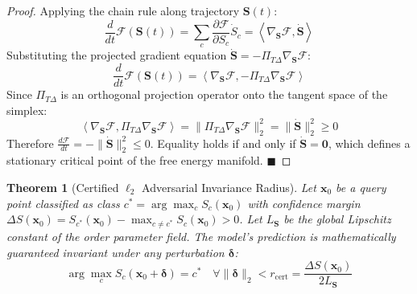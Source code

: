 \documentclass[journal,twoside]{IEEEtran}
\newtheorem{theorem}{Theorem}
\theoremstyle{remark}
\begin{document}
\begin{proof}
Applying the chain rule along trajectory $\mathbf{S}(t)$:
\begin{equation*}
    \frac{d}{dt} \mathcal{F}(\mathbf{S}(t)) = \sum_{c} \frac{\partial \mathcal{F}}{\partial S_c} \dot{S}_c = \left\langle \nabla_{\mathbf{S}} \mathcal{F}, \dot{\mathbf{S}} \right\rangle
\end{equation*}
Substituting the projected gradient equation $\dot{\mathbf{S}} = -\Pi_{T\Delta} \nabla_{\mathbf{S}} \mathcal{F}$:
\begin{equation*}
    \frac{d}{dt} \mathcal{F}(\mathbf{S}(t)) = \left\langle \nabla_{\mathbf{S}} \mathcal{F}, -\Pi_{T\Delta} \nabla_{\mathbf{S}} \mathcal{F} \right\rangle
\end{equation*}
Since $\Pi_{T\Delta}$ is an orthogonal projection operator onto the tangent space of the simplex:
\begin{equation*}
    \left\langle \nabla_{\mathbf{S}} \mathcal{F}, \Pi_{T\Delta} \nabla_{\mathbf{S}} \mathcal{F} \right\rangle = \|\Pi_{T\Delta} \nabla_{\mathbf{S}} \mathcal{F}\|_2^2 = \|\dot{\mathbf{S}}\|_2^2 \ge 0
\end{equation*}
Therefore $\frac{d\mathcal{F}}{dt} = -\|\dot{\mathbf{S}}\|_2^2 \le 0$. Equality holds if and only if $\dot{\mathbf{S}} = \mathbf{0}$, which defines a stationary critical point of the free energy manifold. $\blacksquare$
\end{proof}

\begin{theorem}[Certified $\ell_2$ Adversarial Invariance Radius]
Let $\mathbf{x}_0$ be a query point classified as class $c^* = \arg\max_c S_c(\mathbf{x}_0)$ with confidence margin $\Delta S(\mathbf{x}_0) = S_{c^*}(\mathbf{x}_0) - \max_{c \ne c^*} S_c(\mathbf{x}_0) > 0$. Let $L_{\mathbf{S}}$ be the global Lipschitz constant of the order parameter field. The model's prediction is mathematically guaranteed invariant under any perturbation $\boldsymbol{\delta}$:
\begin{equation}
    \arg\max_c S_c(\mathbf{x}_0 + \boldsymbol{\delta}) = c^* \quad \forall \|\boldsymbol{\delta}\|_2 < r_{\text{cert}} = \frac{\Delta S(\mathbf{x}_0)}{2 L_{\mathbf{S}}}
\end{equation}
\end{theorem}
\end{document}
